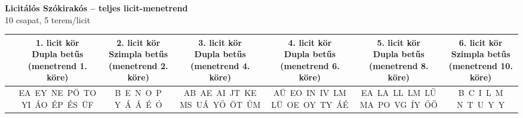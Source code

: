\documentclass[11pt]{extarticle}
\begin{document}
\begin{center}
{\Large \textbf{Licitálós Szókirakós -- teljes licit-menetrend}}\\[4pt]
{\small 10 csapat, 5 terem/licit}
\end{center}
\vspace{8pt}

\begin{center}
\begin{tabular}{|lcccccc|}
\hline
 & \shortstack{\rule{0pt}{3.4ex}\textbf{1. licit kör} \\ Dupla betűs \\ (menetrend 1. köre)\rule[-1.4ex]{0pt}{0pt}} & \shortstack{\rule{0pt}{3.4ex}\textbf{2. licit kör} \\ Szimpla betűs \\ (menetrend 2. köre)\rule[-1.4ex]{0pt}{0pt}} & \shortstack{\rule{0pt}{3.4ex}\textbf{3. licit kör} \\ Dupla betűs \\ (menetrend 4. köre)\rule[-1.4ex]{0pt}{0pt}} & \shortstack{\rule{0pt}{3.4ex}\textbf{4. licit kör} \\ Dupla betűs \\ (menetrend 6. köre)\rule[-1.4ex]{0pt}{0pt}} & \shortstack{\rule{0pt}{3.4ex}\textbf{5. licit kör} \\ Dupla betűs \\ (menetrend 8. köre)\rule[-1.4ex]{0pt}{0pt}} & \shortstack{\rule{0pt}{3.4ex}\textbf{6. licit kör} \\ Szimpla betűs \\ (menetrend 10. köre)\rule[-1.4ex]{0pt}{0pt}} \\ \hline
\textbf{\rule{0pt}{3.4ex}1. terem\rule[-1.4ex]{0pt}{0pt}} & \shortstack{\rule{0pt}{3.4ex}EA~EY~NE~PÖ~TO \\ YI~ÁO~ÉP~ÉS~ÜF\rule[-1.4ex]{0pt}{0pt}} & \shortstack{\rule{0pt}{3.4ex}B~E~N~O~P \\ Y~Á~Á~É~Ó\rule[-1.4ex]{0pt}{0pt}} & \shortstack{\rule{0pt}{3.4ex}AB~AE~AI~JT~KE \\ MS~UÁ~YŐ~ÖT~ŰM\rule[-1.4ex]{0pt}{0pt}} & \shortstack{\rule{0pt}{3.4ex}AÜ~EO~IN~IV~LM \\ LÜ~OE~OY~TY~ÁÉ\rule[-1.4ex]{0pt}{0pt}} & \shortstack{\rule{0pt}{3.4ex}EA~LA~LL~LM~LŰ \\ MA~PO~VG~ÍY~ŐŐ\rule[-1.4ex]{0pt}{0pt}} & \shortstack{\rule{0pt}{3.4ex}B~C~I~L~M \\ N~T~U~Y~Y\rule[-1.4ex]{0pt}{0pt}} \\ \hline

\end{tabular}
\end{center}
\end{document}
